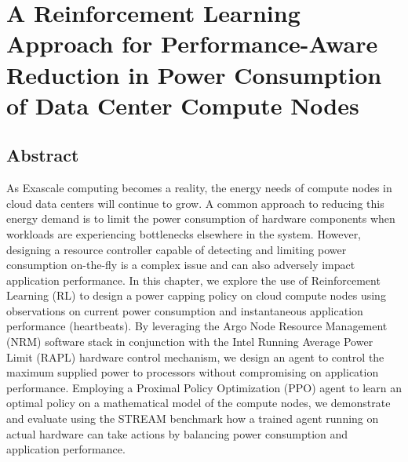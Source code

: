

\chapter{A Reinforcement Learning Approach for Performance-Aware Reduction in Power Consumption of Data Center Compute Nodes} \label{CH3_IC2E}

\graphicspath{{Papers/IC2E/}}

\section*{Abstract}
As Exascale computing becomes a reality, the energy needs of compute nodes in cloud
data centers will continue to grow. A common approach to reducing this energy demand
is to limit the power consumption of hardware components when workloads are
experiencing bottlenecks elsewhere in the system. However, designing a resource
controller capable of detecting and limiting power consumption on-the-fly is a
complex issue and can also adversely impact application performance. In this chapter,
we explore the use of Reinforcement Learning (RL) to design a power capping policy
on cloud compute nodes using observations on current power consumption and
instantaneous application performance (heartbeats). By leveraging the Argo Node
Resource Management (NRM) software stack in conjunction with the Intel Running
Average Power Limit (RAPL) hardware control mechanism, we design an agent to
control the maximum supplied power to processors without compromising on application
performance. Employing a Proximal Policy Optimization (PPO) agent to learn an
optimal policy on a mathematical model of the compute nodes, we demonstrate and
evaluate using the STREAM benchmark how a trained agent running on actual hardware
can take actions by balancing power consumption and application performance.


